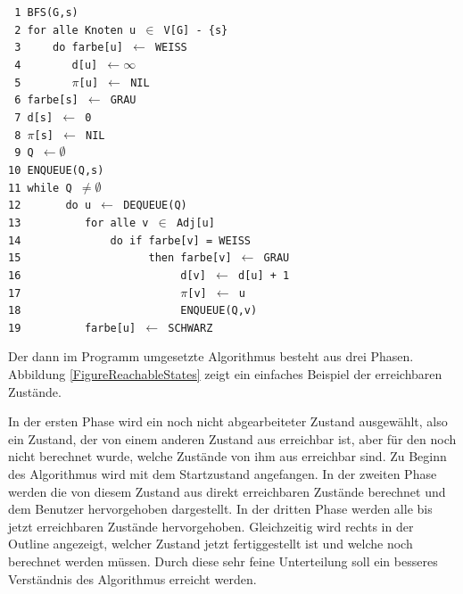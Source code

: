 \noindent
\verb| 1 BFS(G,s)|\\
\verb| 2 for alle Knoten u |$\in$\verb| V[G] - {s}|\\
\verb| 3     do farbe[u] |$\gets$\verb| WEISS|\\
\verb| 4        d[u] |$\gets \infty$\\
\verb| 5        |$\pi$\verb|[u] |$\gets$\verb| NIL|\\
\verb| 6 farbe[s] |$\gets$\verb| GRAU|\\
\verb| 7 d[s] |$\gets$\verb| 0|\\
\verb| 8 |$\pi$\verb|[s] |$\gets$\verb| NIL|\\
\verb| 9 Q |$\gets \emptyset$\\
\verb|10 ENQUEUE(Q,s)|\\
\verb|11 while Q |$\neq \emptyset$\\
\verb|12       do u |$\gets$\verb| DEQUEUE(Q)|\\
\verb|13          for alle v |$\in$\verb| Adj[u]|\\
\verb|14              do if farbe[v] = WEISS|\\
\verb|15                    then farbe[v] |$\gets$\verb| GRAU|\\
\verb|16                         d[v] |$\gets$\verb| d[u] + 1|\\
\verb|17                         |$\pi$\verb|[v] |$\gets$\verb| u|\\
\verb|18                         ENQUEUE(Q,v)|\\
\verb|19          farbe[u] |$\gets$\verb| SCHWARZ|\\
\vspace{10pt}

Der dann im Programm umgesetzte Algorithmus besteht aus drei Phasen. Abbildung
\ref{FigureReachableStates} zeigt ein einfaches Beispiel der erreichbaren
Zustände.\vspace{10pt}

In der ersten Phase wird ein noch nicht abgearbeiteter Zustand ausgewählt, also
ein Zustand, der von einem anderen Zustand aus erreichbar ist, aber für den noch
nicht berechnet wurde, welche Zustände von ihm aus erreichbar sind. Zu Beginn des
Algorithmus wird mit dem Startzustand angefangen. In der zweiten Phase werden die
von diesem Zustand aus direkt erreichbaren Zustände berechnet und dem Benutzer
hervorgehoben dargestellt. In der dritten Phase werden alle bis jetzt
erreichbaren Zustände hervorgehoben. Gleichzeitig wird rechts in der Outline
angezeigt, welcher Zustand jetzt fertiggestellt ist und welche noch berechnet
werden müssen. Durch diese sehr feine Unterteilung soll ein besseres Verständnis
des Algorithmus erreicht werden.\vspace{10pt}

